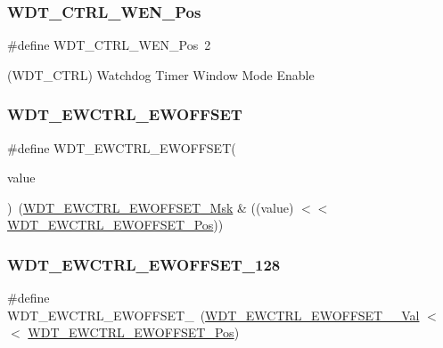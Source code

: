 \subsubsection{\texorpdfstring{WDT\_CTRL\_WEN\_Pos}{WDT\_CTRL\_WEN\_Pos}}
{\footnotesize\ttfamily \#define W\+D\+T\+\_\+\+C\+T\+R\+L\+\_\+\+W\+E\+N\+\_\+\+Pos~2}



(W\+D\+T\+\_\+\+C\+T\+RL) Watchdog Timer Window Mode Enable 

\mbox{\label{group___s_a_m_d21___w_d_t_gaa88d94af62577cb3a8ee526252da2818}} 
\subsubsection{\texorpdfstring{WDT\_EWCTRL\_EWOFFSET}{WDT\_EWCTRL\_EWOFFSET}}
{\footnotesize\ttfamily \#define W\+D\+T\+\_\+\+E\+W\+C\+T\+R\+L\+\_\+\+E\+W\+O\+F\+F\+S\+ET(\begin{DoxyParamCaption}\item[{}]{value }\end{DoxyParamCaption})~(\mbox{\hyperlink{group___s_a_m_d21___w_d_t_ga9552ab7a09bdc45d499a65e49e3a446e}{W\+D\+T\+\_\+\+E\+W\+C\+T\+R\+L\+\_\+\+E\+W\+O\+F\+F\+S\+E\+T\+\_\+\+Msk}} \& ((value) $<$$<$ \mbox{\hyperlink{group___s_a_m_d21___w_d_t_gabb7809711cdf296121c2108b55d3ad33}{W\+D\+T\+\_\+\+E\+W\+C\+T\+R\+L\+\_\+\+E\+W\+O\+F\+F\+S\+E\+T\+\_\+\+Pos}}))}

\mbox{\label{group___s_a_m_d21___w_d_t_gacd40d7e1715b88baa3efd71a871c380c}} 
\subsubsection{\texorpdfstring{WDT\_EWCTRL\_EWOFFSET\_128}{WDT\_EWCTRL\_EWOFFSET\_128}}
{\footnotesize\ttfamily \#define W\+D\+T\+\_\+\+E\+W\+C\+T\+R\+L\+\_\+\+E\+W\+O\+F\+F\+S\+E\+T\+\_~(\mbox{\hyperlink{group___s_a_m_d21___w_d_t_ga0f805aaf53a790a2e0973dfa9df6d91e}{W\+D\+T\+\_\+\+E\+W\+C\+T\+R\+L\+\_\+\+E\+W\+O\+F\+F\+S\+E\+T\+\_\+\_\+\+Val}}   $<$$<$ \mbox{\hyperlink{group___s_a_m_d21___w_d_t_gabb7809711cdf296121c2108b55d3ad33}{W\+D\+T\+\_\+\+E\+W\+C\+T\+R\+L\+\_\+\+E\+W\+O\+F\+F\+S\+E\+T\+\_\+\+Pos}})}

